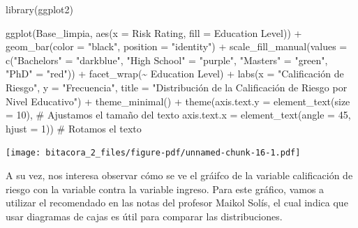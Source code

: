 \documentclass[
  letterpaper,
  DIV=11,
  numbers=noendperiod]{scrreprt}
\newenvironment{Shaded}{\begin{snugshade}}{\end{snugshade}}
\newcommand{\AttributeTok}[1]{\textcolor[rgb]{0.40,0.45,0.13}{#1}}
\newcommand{\CommentTok}[1]{\textcolor[rgb]{0.37,0.37,0.37}{#1}}
\newcommand{\DecValTok}[1]{\textcolor[rgb]{0.68,0.00,0.00}{#1}}
\newcommand{\FunctionTok}[1]{\textcolor[rgb]{0.28,0.35,0.67}{#1}}
\newcommand{\NormalTok}[1]{\textcolor[rgb]{0.00,0.23,0.31}{#1}}
\newcommand{\OtherTok}[1]{\textcolor[rgb]{0.00,0.23,0.31}{#1}}
\newcommand{\SpecialCharTok}[1]{\textcolor[rgb]{0.37,0.37,0.37}{#1}}
\newcommand{\StringTok}[1]{\textcolor[rgb]{0.13,0.47,0.30}{#1}}
\begin{document}
\begin{Shaded}
\begin{Highlighting}[]
\FunctionTok{library}\NormalTok{(ggplot2)}

\FunctionTok{ggplot}\NormalTok{(Base\_limpia, }\FunctionTok{aes}\NormalTok{(}\AttributeTok{x =} \StringTok{\textasciigrave{}}\AttributeTok{Risk Rating}\StringTok{\textasciigrave{}}\NormalTok{, }\AttributeTok{fill =} \StringTok{\textasciigrave{}}\AttributeTok{Education Level}\StringTok{\textasciigrave{}}\NormalTok{)) }\SpecialCharTok{+}  
  \FunctionTok{geom\_bar}\NormalTok{(}\AttributeTok{color =} \StringTok{"black"}\NormalTok{, }\AttributeTok{position =} \StringTok{"identity"}\NormalTok{) }\SpecialCharTok{+}  
  \FunctionTok{scale\_fill\_manual}\NormalTok{(}\AttributeTok{values =} \FunctionTok{c}\NormalTok{(}\StringTok{"Bachelor\textquotesingle{}s"} \OtherTok{=} \StringTok{"darkblue"}\NormalTok{, }\StringTok{"High School"} \OtherTok{=} \StringTok{"purple"}\NormalTok{, }\StringTok{"Master\textquotesingle{}s"} \OtherTok{=} \StringTok{"green"}\NormalTok{, }\StringTok{"PhD"} \OtherTok{=} \StringTok{"red"}\NormalTok{)) }\SpecialCharTok{+}  
  \FunctionTok{facet\_wrap}\NormalTok{(}\SpecialCharTok{\textasciitilde{}} \StringTok{\textasciigrave{}}\AttributeTok{Education Level}\StringTok{\textasciigrave{}}\NormalTok{) }\SpecialCharTok{+}  
  \FunctionTok{labs}\NormalTok{(}\AttributeTok{x =} \StringTok{"Calificación de Riesgo"}\NormalTok{, }\AttributeTok{y =} \StringTok{"Frecuencia"}\NormalTok{, }\AttributeTok{title =} \StringTok{"Distribución de la Calificación de Riesgo por Nivel Educativo"}\NormalTok{) }\SpecialCharTok{+} 
  \FunctionTok{theme\_minimal}\NormalTok{() }\SpecialCharTok{+}
  \FunctionTok{theme}\NormalTok{(}\AttributeTok{axis.text.y =} \FunctionTok{element\_text}\NormalTok{(}\AttributeTok{size =} \DecValTok{10}\NormalTok{), }\CommentTok{\# Ajustamos el tamaño del texto}
        \AttributeTok{axis.text.x =} \FunctionTok{element\_text}\NormalTok{(}\AttributeTok{angle =} \DecValTok{45}\NormalTok{, }\AttributeTok{hjust =} \DecValTok{1}\NormalTok{))  }\CommentTok{\# Rotamos el texto}
\end{Highlighting}
\end{Shaded}

\texttt{[image: bitacora\_2\_files/figure-pdf/unnamed-chunk-16-1.pdf]}

A su vez, nos interesa observar cómo se ve el gráifco de la variable
calificación de riesgo con la variable contra la variable ingreso. Para
este gráfico, vamos a utilizar el recomendado en las notas del profesor
Maikol Solís, el cual indica que usar diagramas de cajas es útil para
comparar las distribuciones.
\end{document}
